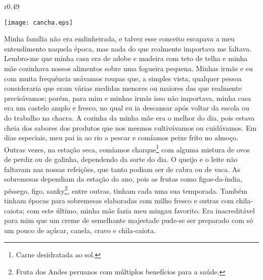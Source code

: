\ifdefined\EnableIncludeImages
\begin{wrapfigure}{r}{0.49\textwidth}
  \begin{center}
  \vspace{-20pt}
    \texttt{[image: cancha.eps]}
  \end{center}
  \vspace{-20pt}
\end{wrapfigure}
\fi
Minha família não era endinheirada, e talvez esse conceito escapava a meu entendimento naquela época, mas nada do que realmente importava me faltava.
Lembro-me que minha casa era de adobe e madeira com teto de telha e minha mãe cozinhava nossos alimentos sobre uma fogueira pequena. Minhas irmãs e eu com muita frequência usávamos roupas que, a simples vista, qualquer pessoa consideraria que eram várias medidas menores ou maiores das que realmente precisávamos;
porém, para mim e minhas irmãs isso não importava, minha casa era um castelo amplo e fresco, no qual eu ia descansar após voltar da escola ou do trabalho na chacra. 
A cozinha da minha mãe era o melhor do dia, pois estava cheia dos sabores dos produtos que nos mesmos cultivávamos ou cuidávamos. 
Em dias especiais, meu pai ia ao rio a pescar e comíamos peixe frito no almoço. Outras vezes, na estação seca, comíamos charque\footnote{Carne desidratada ao sol.} com alguma mistura de ovos de perdiz ou de galinha, dependendo da sorte do dia.
O queijo e o leite não faltavam nas nossas refeições, que tanto podiam ser de cabra ou de vaca.
As sobremesas dependiam da estação do ano, pois as frutas como figos-da-índia, pêssego, figo, sanky\footnote{Fruta dos Andes peruanos com múltiplos benefícios para a saúde.}, entre outras, tinham cada uma sua temporada. Também tinham épocas para sobremesas elaboradas com milho fresco e outras com chila-caiota; com este último, minha mãe fazia meu mingau favorito. Era inacreditável para mim que um creme de semelhante majestade pude-se ser preparado com só um pouco de açúcar, canela, cravo e chila-caiota.

